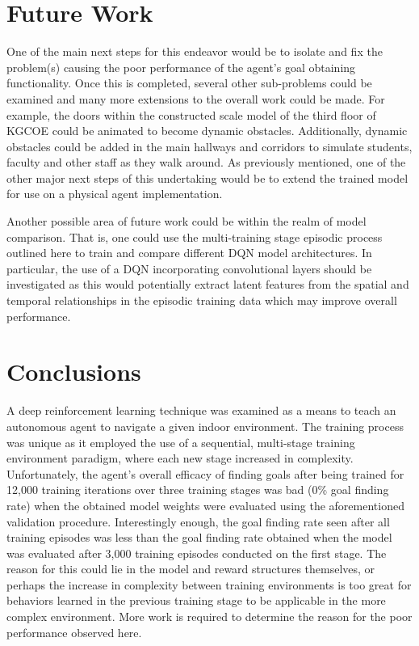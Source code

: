 \documentclass[conference]{IEEEtran}
\begin{document}
\section{Future Work}
One of the main next steps for this endeavor would be to isolate and fix the problem(s) causing the poor performance of the agent's goal obtaining functionality. Once this is completed, several other sub-problems could be examined and many more extensions to the overall work could be made. For example, the doors within the constructed scale model of the third floor of KGCOE could be animated to become dynamic obstacles. Additionally, dynamic obstacles could be added in the main hallways and corridors to simulate students, faculty and other staff as they walk around. As previously mentioned, one of the other major next steps of this undertaking would be to extend the trained model for use on a physical agent implementation. 

Another possible area of future work could be within the realm of model comparison. That is, one could use the multi-training stage episodic process outlined here to train and compare different DQN model architectures. In particular, the use of a DQN incorporating convolutional layers should be investigated as this would potentially extract latent features from the spatial and temporal relationships in the episodic training data which may improve overall performance. 

\section{Conclusions}
A deep reinforcement learning technique was examined as a means to teach an autonomous agent to navigate a given indoor environment. The training process was unique as it employed the use of a sequential, multi-stage training environment paradigm, where each new stage increased in complexity. Unfortunately, the agent's overall efficacy of finding goals after being trained for 12,000 training iterations over three training stages was bad (0\% goal finding rate) when the obtained model weights were evaluated using the aforementioned validation procedure. Interestingly enough, the goal finding rate seen after all training episodes was less than the goal finding rate obtained when the model was evaluated after 3,000 training episodes conducted on the first stage. The reason for this could lie in the model and reward structures themselves, or perhaps the increase in complexity between training environments is too great for behaviors learned in the previous training stage to be applicable in the more complex environment. More work is required to determine the reason for the poor performance observed here. 
\end{document}
